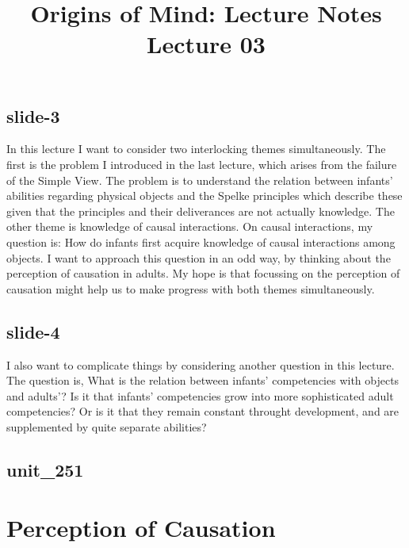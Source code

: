 \documentclass[12pt,\papersize]{extarticle}
\begin{document}
\setlength\footnotesep{1em}






\title {Origins of Mind: Lecture Notes \\ Lecture 03}
 
\maketitle
 
 
\subsection{slide-3}
In this lecture I want to consider two interlocking themes simultaneously. The first is the problem I introduced in the last lecture, which arises from the failure of the Simple View. The problem is to understand the relation between infants' abilities regarding physical objects and the Spelke principles which describe these given that the principles and their deliverances are not actually knowledge. The other theme is knowledge of causal interactions. On causal interactions, my question is: How do infants first acquire knowledge of causal interactions among objects. I want to approach this question in an odd way, by thinking about the perception of causation in adults. My hope is that focussing on the perception of causation might help us to make progress with both themes simultaneously.
 
 
\subsection{slide-4}
I also want to complicate things by considering another question in this lecture. The question is, What is the relation between infants' competencies with objects and adults'? Is it that infants' competencies grow into more sophisticated adult competencies? Or is it that they remain constant throught development, and are supplemented by quite separate abilities?
 
 
\subsection{unit\_251}
 
\section{Perception of Causation}
 
\end{document}
